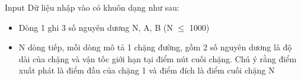 Input
Dữ liệu nhập vào có khuôn dạng như sau:
\begin{itemize}
	\item Dòng 1 ghi 3 số nguyên dương N, A, B (N  $\le$  1000)
	\item N dòng tiếp, mỗi dòng mô tả 1 chặng đường, gồm 2 số nguyên dương là độ dài của chặng và vận tốc giới hạn tại điểm nút cuối chặng. Chú ý rằng điểm xuất phát là điểm đầu của chặng 1 và điểm đích là điểm cuối chặng N
\end{itemize}